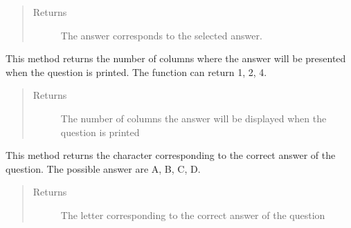 \documentclass[letterpaper,10pt,english]{sphinxmanual}
\begin{document}
\begin{fulllineitems}
\begin{fulllineitems}
\begin{quote}
\begin{description}
\item[{Returns}] \leavevmode
The answer corresponds to the selected answer.

\end{description}\end{quote}

\end{fulllineitems}


\begin{fulllineitems}
\label{\detokenize{index:pytexexam.question.Question.get_answer_column}}
This method returns the number of columns where the answer will be presented when the
question is printed. The function can return 1, 2, 4.
\begin{quote}\begin{description}
\item[{Returns}] \leavevmode
The number of columns the answer will be displayed when the question is printed

\end{description}\end{quote}

\end{fulllineitems}


\begin{fulllineitems}
\label{\detokenize{index:pytexexam.question.Question.get_true_answer}}
This method returns the character corresponding to the correct answer of the question.
The possible answer are A, B, C, D.
\begin{quote}\begin{description}
\item[{Returns}] \leavevmode
The letter corresponding to the correct answer of the question

\end{description}\end{quote}

\end{fulllineitems}


\end{fulllineitems}
\end{document}
